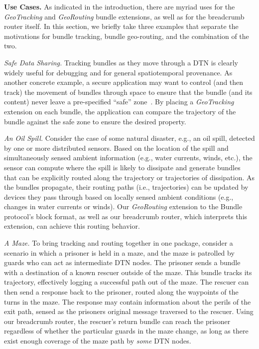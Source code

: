 %
%

{\bf Use Cases.} As indicated in the introduction, there are myriad
uses for the {\em GeoTracking} and {\em GeoRouting} bundle extensions,
as well as for the {\sc breadcrumb} router itself. In this section, we
briefly take three examples that separate the motivations for bundle
tracking, bundle geo-routing, and the combination of the two.

{\it Safe Data Sharing.} Tracking bundles as they move through a DTN
is clearly widely useful for debugging and for general spatiotemporal
provenance. As another concrete example, a secure application may want
to control (and then track) the movement of bundles through space to
ensure that the bundle (and its content) never leave a pre-specified
``safe'' zone~\cite{michel12:spatiotemporal}. By placing a {\em
  GeoTracking} extension on each bundle, the application can compare
the trajectory of the bundle against the safe zone to ensure the
desired property.

{\it An Oil Spill.} Consider the case of some natural disaster, e.g.,
an oil spill, detected by one or more distributed sensors. Based on
the location of the spill and simultaneously sensed ambient
information (e.g., water currents, winds, etc.), the sensor can
compute where the spill is likely to dissipate and generate
bundles that can be explicitly routed along the trajectory or
trajectories of dissipation. As the bundles propagate, their routing
paths (i.e., trajectories) can be updated by devices they pass through
based on locally sensed ambient conditions (e.g., changes in water
currents or winds). Our {\em GeoRouting} extension to the Bundle
protocol's block format, as well as our {\sc breadcrumb} router, which
interprets this extension, can achieve this routing behavior.

{\it A Maze.} To bring tracking and routing together in one package,
consider a scenario in which a prisoner is held in a maze, and the
maze is patrolled by guards who can act as intermediate DTN nodes. The
prisoner sends a bundle with a destination of a known rescuer outside
of the maze. This bundle tracks its trajectory, effectively logging a
successful path out of the maze. The rescuer can then send a response
back to the prisoner, routed along the waypoints of the turns in the
maze. The response may contain information about the perils of the
exit path, sensed as the prisoners original message traversed to the
rescuer. Using our {\sc breadcrumb} router, the rescuer's return
bundle can reach the prisoner regardless of whether the particular
guards in the maze change, as long as there exist enough coverage of
the maze path by {\em some} DTN nodes.







